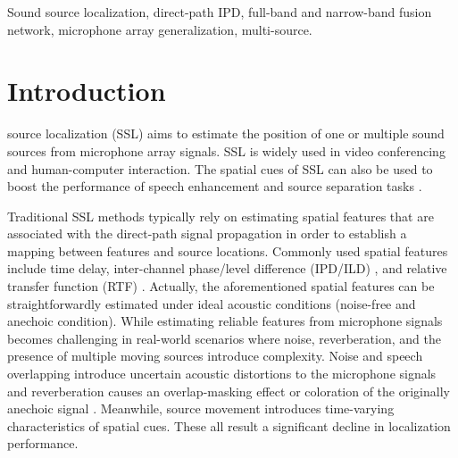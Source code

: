 \documentclass[lettersize,journal]{IEEEtran}
\begin{document}
\begin{IEEEkeywords}
Sound source localization, direct-path IPD, full-band and narrow-band fusion network, microphone array generalization, multi-source. %
\end{IEEEkeywords}

\section{Introduction}
 source localization (SSL) aims to estimate the position of one or multiple sound sources from microphone array signals. SSL is widely used in video conferencing and human-computer interaction. The spatial cues of SSL can also be used to boost the performance of speech enhancement and source separation tasks \cite{Lee2016DNNBasedFE, Chazan2019MultiMicrophoneSS}. 

Traditional SSL methods typically rely on estimating spatial features that are associated with the direct-path signal propagation in order to establish a mapping between features and source locations. Commonly used spatial features include time delay, inter-channel phase/level difference (IPD/ILD) \cite{4967888, Zhang2010ATM}, and relative transfer function (RTF) \cite{Braun2015NarrowbandDE, Wang2018SemiSupervisedLW}. Actually, the aforementioned spatial features can be straightforwardly estimated under ideal acoustic conditions (noise-free and anechoic condition). While estimating reliable features from microphone signals becomes challenging in real-world scenarios where noise, reverberation, and the presence of multiple moving sources introduce complexity. 
Noise and speech overlapping introduce uncertain acoustic distortions to the microphone signals and reverberation causes an overlap-masking effect or coloration of the originally anechoic signal \cite{Jeub2010ModelBasedDP}. Meanwhile, source movement introduces time-varying characteristics of spatial cues. 
These all result a significant decline in localization performance. 
\end{document}
